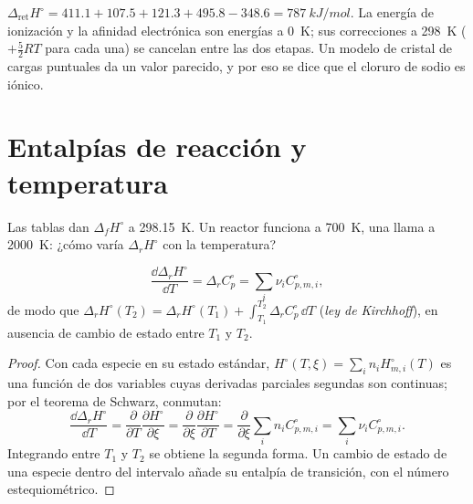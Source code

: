\begin{example}\label{ex:b2:reaction-enthalpy:nacl}
$\Delta_{\text{ret}}H^\circ = 411.1 + 107.5 + 121.3 + 495.8 - 348.6 =
\qty{787}{kJ/mol}$. La energía de ionización y la afinidad electrónica son
energías a \qty{0}{K}; sus correcciones a \qty{298}{K} ($+\tfrac52RT$
para cada una) se cancelan entre las dos etapas. Un modelo de cristal de cargas puntuales
da un valor parecido, y por eso se dice que el cloruro de sodio es iónico.
\end{example}

\section{Entalpías de reacción y temperatura}

Las tablas dan $\Delta_f H^\circ$ a \qty{298.15}{K}. Un reactor funciona a
\qty{700}{K}, una llama a \qty{2000}{K}: ¿cómo varía $\Delta_r H^\circ$
con la temperatura?

\begin{theorem}\label{thm:b2:reaction-enthalpy:kirchhoff}
\[
  \frac{\dd\Delta_r H^\circ}{\dd T} = \Delta_r C_p^\circ =
  \sum_i\nu_i C_{p,m,i}^\circ ,
\]
de modo que $\Delta_r H^\circ(T_2) = \Delta_r H^\circ(T_1) + \int_{T_1}^{T_2}
\Delta_r C_p^\circ\,\dd T$ (\emph{ley de Kirchhoff}),
en ausencia de cambio de estado entre $T_1$ y $T_2$.
\end{theorem}

\begin{proof}
Con cada especie en su estado estándar, $H^\circ(T, \xi) = \sum_in_i
H^\circ_{m,i}(T)$ es una función de dos variables cuyas derivadas parciales
segundas son continuas; por el teorema de Schwarz, conmutan:
\[
  \frac{\dd\Delta_r H^\circ}{\dd T} = \frac{\partial}{\partial T}
  \frac{\partial H^\circ}{\partial\xi} = \frac{\partial}{\partial\xi}
  \frac{\partial H^\circ}{\partial T} = \frac{\partial}{\partial\xi}
  \sum_in_iC^\circ_{p,m,i} = \sum_i\nu_iC^\circ_{p,m,i}.
\]
Integrando entre $T_1$ y $T_2$ se obtiene la segunda forma. Un cambio de
estado de una especie dentro del intervalo añade su entalpía de transición,
con el número estequiométrico.
\end{proof}

